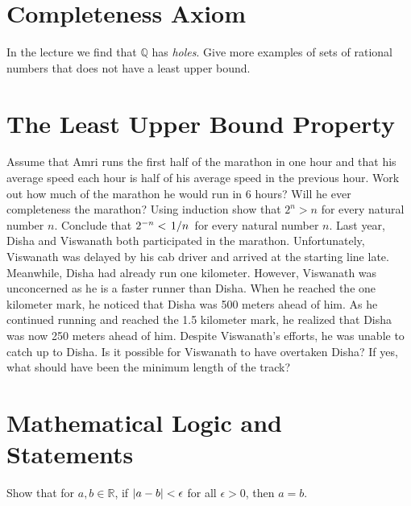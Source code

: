 \documentclass[12pt]{exam}
\begin{document}
\section{Completeness Axiom}
\begin{questions}
    \question In the lecture we find that $\mathbb{Q}$ has \textit{holes}. Give more examples of sets of rational numbers that does not have a least upper bound.
\end{questions}
\section{The Least Upper Bound Property}
\begin{questions}
    \question Assume that Amri runs the first half of the marathon in one hour and that his average speed each hour is half of his average speed in the previous hour. Work out how much of the marathon he would run in 6 hours? Will he ever completeness the marathon?  
    \question Using induction show that $2^n > n$ for every natural number $n$. Conclude that $2^{-n}<\flatfrac{1}{n}$ for every natural number $n$.
    \question Last year, Disha and Viswanath both participated in the marathon. Unfortunately, Viswanath was delayed by his cab driver and arrived at the starting line late. Meanwhile, Disha had already run one kilometer. However, Viswanath was unconcerned as he is a faster runner than Disha. When he reached the one kilometer mark, he noticed that Disha was 500 meters ahead of him. As he continued running and reached the 1.5 kilometer mark, he realized that Disha was now 250 meters ahead of him. Despite Viswanath's efforts, he was unable to catch up to Disha. Is it possible for Viswanath to have overtaken Disha? If yes, what should have been the minimum length of the track?
\end{questions}
\section{Mathematical Logic and Statements}
\begin{questions}
    \question Show that for $a, b \in \mathbb{R}$, if $\abs{a - b} < \epsilon$ for all $\epsilon > 0$, then $a = b$. 
\end{questions}
\end{document}

